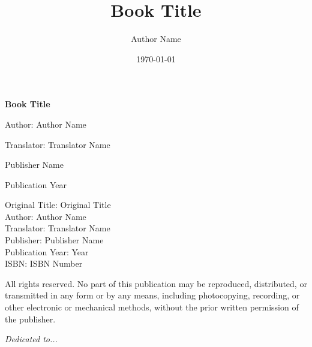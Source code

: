 \documentclass[12pt,a4paper,oneside]{book}
\title{Book Title}
\author{Author Name}
\date{\today}
\begin{document}
\frontmatter

\begin{titlepage}
\centering
\vspace*{2cm}

{\Huge\bfseries Book Title}

\vspace{1.5cm}

{\Large Author: Author Name}

\vspace{1cm}

{\large Translator: Translator Name}

\vspace{2cm}


\vspace{2cm}

{\large Publisher Name}

\vspace{1cm}

{\large Publication Year}

\vfill

\end{titlepage}

\newpage
\thispagestyle{empty}
\vspace*{10cm}

\noindent
Original Title: Original Title\\
Author: Author Name\\
Translator: Translator Name\\
Publisher: Publisher Name\\
Publication Year: Year\\
ISBN: ISBN Number\\

\vspace{1cm}

\noindent
All rights reserved. No part of this publication may be reproduced, distributed, or transmitted in any form or by any means, including photocopying, recording, or other electronic or mechanical methods, without the prior written permission of the publisher.

\newpage

\thispagestyle{empty}
\vspace*{8cm}
\begin{center}
{\large\itshape Dedicated to...}
\end{center}
\newpage
\end{document}
